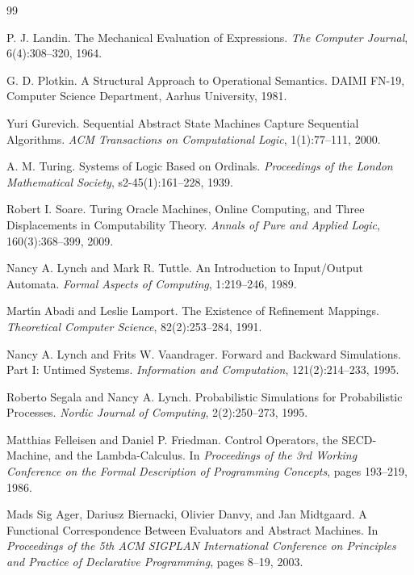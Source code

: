 \documentclass[11pt]{article}
\begin{document}
\begin{thebibliography}{99}

P. J. Landin.
\newblock The Mechanical Evaluation of Expressions.
\newblock \emph{The Computer Journal}, 6(4):308--320, 1964.

G. D. Plotkin.
\newblock A Structural Approach to Operational Semantics.
\newblock DAIMI FN-19, Computer Science Department, Aarhus University, 1981.

Yuri Gurevich.
\newblock Sequential Abstract State Machines Capture Sequential Algorithms.
\newblock \emph{ACM Transactions on Computational Logic}, 1(1):77--111, 2000.

A. M. Turing.
\newblock Systems of Logic Based on Ordinals.
\newblock \emph{Proceedings of the London Mathematical Society}, s2-45(1):161--228, 1939.

Robert I. Soare.
\newblock Turing Oracle Machines, Online Computing, and Three Displacements in Computability Theory.
\newblock \emph{Annals of Pure and Applied Logic}, 160(3):368--399, 2009.

Nancy A. Lynch and Mark R. Tuttle.
\newblock An Introduction to Input/Output Automata.
\newblock \emph{Formal Aspects of Computing}, 1:219--246, 1989.

Mart\'\i n Abadi and Leslie Lamport.
\newblock The Existence of Refinement Mappings.
\newblock \emph{Theoretical Computer Science}, 82(2):253--284, 1991.

Nancy A. Lynch and Frits W. Vaandrager.
\newblock Forward and Backward Simulations. Part I: Untimed Systems.
\newblock \emph{Information and Computation}, 121(2):214--233, 1995.

Roberto Segala and Nancy A. Lynch.
\newblock Probabilistic Simulations for Probabilistic Processes.
\newblock \emph{Nordic Journal of Computing}, 2(2):250--273, 1995.

Matthias Felleisen and Daniel P. Friedman.
\newblock Control Operators, the SECD-Machine, and the Lambda-Calculus.
\newblock In \emph{Proceedings of the 3rd Working Conference on the Formal Description of Programming Concepts}, pages 193--219, 1986.

Mads Sig Ager, Dariusz Biernacki, Olivier Danvy, and Jan Midtgaard.
\newblock A Functional Correspondence Between Evaluators and Abstract Machines.
\newblock In \emph{Proceedings of the 5th ACM SIGPLAN International Conference on Principles and Practice of Declarative Programming}, pages 8--19, 2003.


\end{thebibliography}
\end{document}
